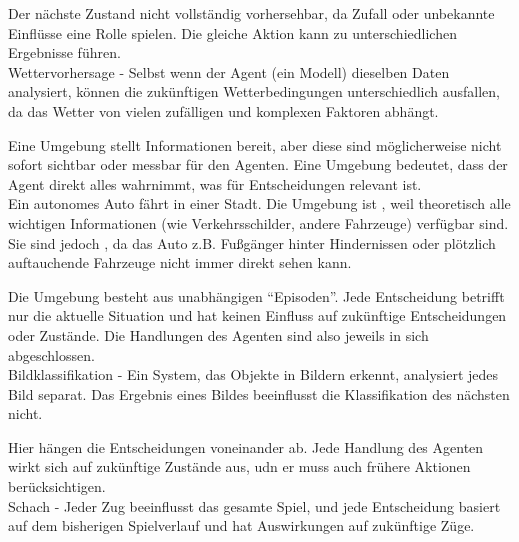 \begin{infoBox}[title=Nicht-deterministisch/Stochastisch]
    Der nächste Zustand nicht vollständig vorhersehbar, da Zufall oder unbekannte Einflüsse eine Rolle spielen. Die gleiche Aktion kann zu unterschiedlichen Ergebnisse führen.\\
     Wettervorhersage - Selbst wenn der Agent (ein Modell) dieselben Daten analysiert, können die zukünftigen Wetterbedingungen unterschiedlich ausfallen, da das Wetter von vielen zufälligen und komplexen Faktoren abhängt.
\end{infoBox}
\begin{infoBox}[title=Defference between Accessible and Observable]
    Eine  Umgebung stellt Informationen bereit, aber diese sind möglicherweise nicht sofort sichtbar oder messbar für den Agenten. Eine  Umgebung bedeutet, dass der Agent direkt alles wahrnimmt, was für Entscheidungen relevant ist.\\
     Ein autonomes Auto fährt in einer Stadt. Die Umgebung ist , weil theoretisch alle wichtigen Informationen (wie Verkehrsschilder, andere Fahrzeuge) verfügbar sind. Sie sind jedoch , da das Auto z.B. Fußgänger hinter Hindernissen oder plötzlich auftauchende Fahrzeuge nicht immer direkt sehen kann.
\end{infoBox}
\begin{infoBox}[title=Episodisch]
    Die Umgebung besteht aus unabhängigen \enquote{Episoden}. Jede Entscheidung betrifft nur die aktuelle Situation und hat keinen Einfluss auf zukünftige Entscheidungen oder Zustände. Die Handlungen des Agenten sind also jeweils in sich abgeschlossen.\\
     Bildklassifikation - Ein System, das Objekte in Bildern erkennt, analysiert jedes Bild separat. Das Ergebnis eines Bildes beeinflusst die Klassifikation des nächsten nicht.
\end{infoBox}
\begin{infoBox}[title=Nicht-Episodisch/Sequenziell]
    Hier hängen die Entscheidungen voneinander ab. Jede Handlung des Agenten wirkt sich auf zukünftige Zustände aus, udn er muss auch frühere Aktionen berücksichtigen.\\
     Schach - Jeder Zug beeinflusst das gesamte Spiel, und jede Entscheidung basiert auf dem bisherigen Spielverlauf und hat Auswirkungen auf zukünftige Züge.
\end{infoBox}

